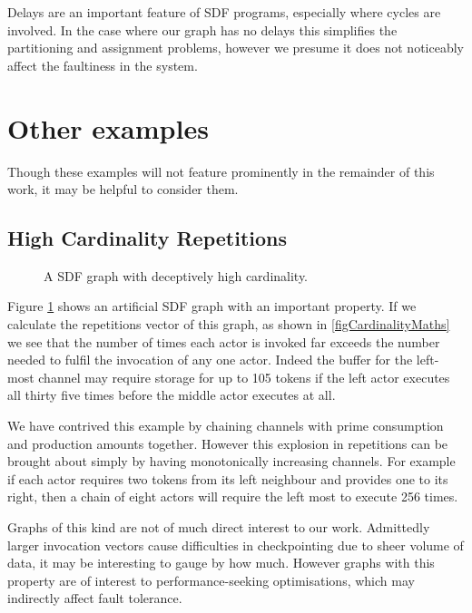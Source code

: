 Delays are an important feature of SDF programs, especially where cycles are involved.
In the case where our graph has no delays this simplifies the partitioning and assignment problems, however we presume it does not noticeably affect the faultiness in the system.

\section{Other examples}

Though these examples will not feature prominently in the remainder of this work, it may be helpful to consider them.

\subsection{High Cardinality Repetitions}

\begin{figure}
\begin{center}
	
\caption{A SDF graph with deceptively high cardinality.}
\label{figCardinality}
\end{center}
\end{figure}

Figure \ref{figCardinality} shows an artificial SDF graph with an important property.
If we calculate the repetitions vector of this graph, as shown in \ref{figCardinalityMaths} we see that the number of times each actor is invoked far exceeds the number needed to fulfil the invocation of any one actor.
Indeed the buffer for the left-most channel may require storage for up to 105 tokens if the left actor executes all thirty five times before the middle actor executes at all.

We have contrived this example by chaining channels with prime consumption and production amounts together.
However this explosion in repetitions can be brought about simply by having monotonically increasing channels.
For example if each actor requires two tokens from its left neighbour and provides one to its right, then a chain of eight actors will require the left most to execute 256 times.

Graphs of this kind are not of much direct interest to our work.
Admittedly larger invocation vectors cause difficulties in checkpointing due to sheer volume of data, it may be interesting to gauge by how much.
However graphs with this property are of interest to performance-seeking optimisations, which may indirectly affect fault tolerance.

